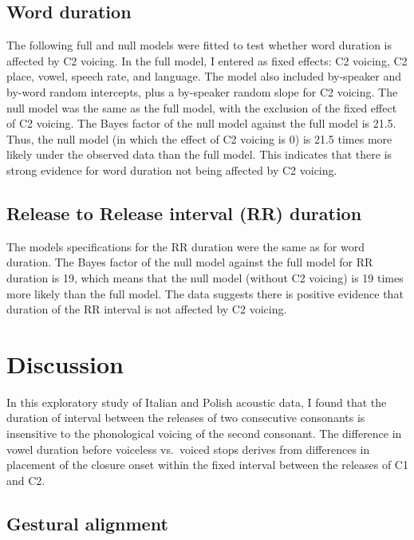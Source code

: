 \documentclass[]{JASAnew}
\begin{document}
\hypertarget{word-duration}{%
\subsection{Word duration}\label{word-duration}}

The following full and null models were fitted to test whether word
duration is affected by C2 voicing. In the full model, I entered as
fixed effects: C2 voicing, C2 place, vowel, speech rate, and language.
The model also included by-speaker and by-word random intercepts, plus a
by-speaker random slope for C2 voicing. The null model was the same as
the full model, with the exclusion of the fixed effect of C2 voicing.
The Bayes factor of the null model against the full model is 21.5. Thus,
the null model (in which the effect of C2 voicing is 0) is 21.5 times
more likely under the observed data than the full model. This indicates
that there is strong evidence for word duration not being affected by C2
voicing.

\hypertarget{release-to-release-interval-rr-duration}{%
\subsection{Release to Release interval (RR)
duration}\label{release-to-release-interval-rr-duration}}

The models specifications for the RR duration were the same as for word
duration. The Bayes factor of the null model against the full model for
RR duration is 19, which means that the null model (without C2 voicing)
is 19 times more likely than the full model. The data suggests there is
positive evidence that duration of the RR interval is not affected by C2
voicing.

\hypertarget{discussion}{%
\section{Discussion}\label{discussion}}

In this exploratory study of Italian and Polish acoustic data, I found
that the duration of interval between the releases of two consecutive
consonants is insensitive to the phonological voicing of the second
consonant. The difference in vowel duration before voiceless vs.~voiced
stops derives from differences in placement of the closure onset within
the fixed interval between the releases of C1 and C2.

\hypertarget{gestural-alignment}{%
\subsection{Gestural alignment}\label{gestural-alignment}}
\end{document}
